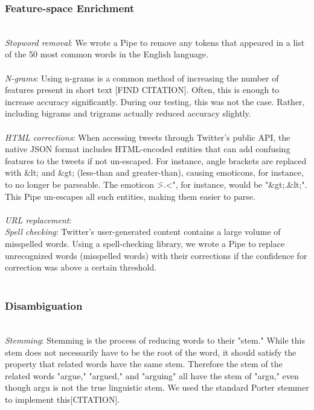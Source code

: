 \documentclass[letterpaper]{article}
\begin{document}
\subsubsection{Feature-space Enrichment} ~\\
\textit{Stopword removal}: We wrote a Pipe to remove any tokens that appeared in a list of the 50 most common words in the English language.\\
~\\
\textit{N-grams}: Using n-grams is a common method of increasing the number of features present in short text [FIND CITATION]\cite{article_label,book_label}. Often, this is enough to increase accuracy significantly. During our testing, this was not the case. Rather, including bigrams and trigrams actually reduced accuracy slightly.\\
~\\
\textit{HTML corrections}: When accessing tweets through Twitter's public API, the native JSON format includes HTML-encoded entities that can add confusing features to the tweets if not un-escaped. For instance, angle brackets are replaced with \&lt; and \&gt; (less-than and greater-than), causing emoticons, for instance, to no longer be parseable. The emoticon \">.<", for instance, would be "\&gt;.\&lt;". This Pipe un-escapes all such entities, making them easier to parse.\\
~\\
\textit{URL replacement}: 
~\\
\textit{Spell checking}: Twitter's user-generated content contains a large volume of misspelled words. Using a spell-checking library, we wrote a Pipe to replace unrecognized words (misspelled words) with their corrections if the confidence for correction was above a certain threshold. \\
~\\
\subsubsection{Disambiguation}
~\\
\textit{Stemming}: Stemming is the process of reducing words to their "stem." While this stem does not necessarily have to be the root of the word, it should satisfy the property that related words have the same stem. Therefore the stem of the related words "argue," "argued," and "arguing" all have the stem of "argu," even though argu is not the true linguistic stem. We used the standard Porter stemmer to implement this[CITATION].\\
\end{document}
